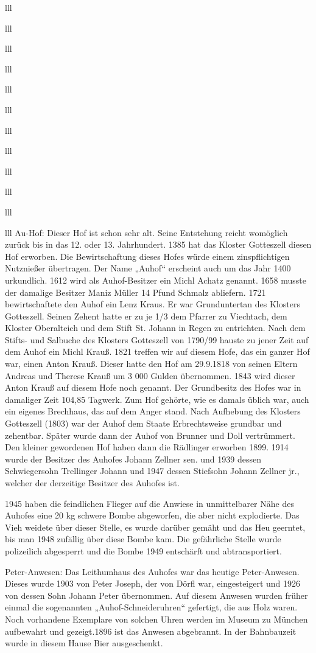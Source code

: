 \documentclass[12pt,a4pager]{book}
\begin{document}
\begin{tabuluar}{lll}
\begin{tabuluar}{lll}
\begin{tabuluar}{lll}
\begin{tabuluar}{lll}
\begin{tabuluar}{lll}
\begin{tabuluar}{lll}
\begin{tabuluar}{lll}
\begin{tabuluar}{lll}
\begin{tabuluar}{lll}
\begin{tabuluar}{lll}
\begin{tabuluar}{lll}
\begin{tabuluar}{lll}
Au-Hof: Dieser Hof ist schon sehr alt. Seine Entstehung reicht womöglich zurück
bis in das 12. oder 13. Jahrhundert. 1385 hat das Kloster Gotteszell diesen Hof
erworben. Die Bewirtschaftung dieses Hofes würde einem zinspflichtigen
Nutznießer übertragen. Der Name „Auhof“ erscheint auch um das Jahr 1400
urkundlich. 1612 wird als Auhof-Besitzer ein Michl Achatz genannt. 1658 musste
der damalige Besitzer Maniz Müller 14 Pfund Schmalz abliefern. 1721
bewirtschaftete den Auhof ein Lenz Kraus. Er war Grunduntertan des Klosters
Gotteszell. Seinen Zehent hatte er zu je 1/3 dem Pfarrer zu Viechtach, dem
Kloster Oberalteich und dem Stift St. Johann in Regen zu entrichten. Nach dem
Stifts- und Salbuche des Klosters Gotteszell von 1790/99 hauste zu jener Zeit
auf dem Auhof ein Michl Krauß. 1821 treffen wir auf diesem Hofe, das ein ganzer
Hof war, einen Anton Krauß. Dieser hatte den Hof am 29.9.1818 von seinen Eltern
Andreas und Therese Krauß um 3 000 Gulden übernommen. 1843 wird dieser Anton
Krauß auf diesem Hofe noch genannt. Der Grundbesitz des Hofes war in damaliger
Zeit 104,85 Tagwerk. Zum Hof gehörte, wie es damals üblich war, auch ein eigenes
Brechhaus, das auf dem Anger stand. Nach Aufhebung des Klosters Gotteszell
(1803) war der Auhof dem Staate Erbrechtsweise grundbar und zehentbar. Später
wurde dann der Auhof von Brunner und Doll vertrümmert. Den kleiner gewordenen
Hof haben dann die Rädlinger erworben 1899. 1914 wurde der Besitzer des Auhofes
Johann Zellner sen. und 1939 dessen Schwiegersohn Trellinger Johann und 1947
dessen Stiefsohn Johann Zellner jr., welcher der derzeitige Besitzer des Auhofes
ist.

1945 haben die feindlichen Flieger auf die Anwiese in unmittelbarer Nähe des
Auhofes eine 20 kg schwere Bombe abgeworfen, die aber nicht explodierte. Das
Vieh weidete über dieser Stelle, es wurde darüber gemäht und das Heu geerntet,
bis man 1948 zufällig über diese Bombe kam. Die gefährliche Stelle wurde
polizeilich abgesperrt und die Bombe 1949 entschärft und abtransportiert.

Peter-Anwesen: Das Leithumhaus des Auhofes war das heutige Peter-Anwesen. Dieses
wurde 1903 von Peter Joseph, der von Dörfl war, eingesteigert und 1926 von
dessen Sohn Johann Peter übernommen. Auf diesem Anwesen wurden früher einmal die
sogenannten „Auhof-Schneideruhren“ gefertigt, die aus Holz waren. Noch
vorhandene Exemplare von solchen Uhren werden im Museum zu München aufbewahrt
und gezeigt.1896 ist das Anwesen abgebrannt. In der Bahnbauzeit wurde in diesem
Hause Bier ausgeschenkt.


\end{tabuluar}
\end{tabuluar}
\end{tabuluar}
\end{tabuluar}
\end{tabuluar}
\end{tabuluar}
\end{tabuluar}
\end{tabuluar}
\end{tabuluar}
\end{tabuluar}
\end{tabuluar}
\end{tabuluar}
\end{document}
